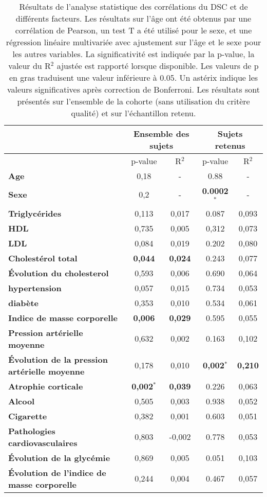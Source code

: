 \begin {table}
\caption{Résultats de l’analyse statistique des corrélations du DSC et de différents facteurs. Les résultats sur l’âge ont été
obtenus par une corrélation de Pearson, un test T a été utilisé pour le sexe, et une régression linéaire multivariée avec
ajustement sur l’âge et le sexe pour les autres variables. La significativité est indiquée par la p-value, la valeur du R$^2$ ajustée
est rapporté lorsque disponible. Les valeurs de p en gras traduisent une valeur inférieure à 0.05. Un astérix indique les valeurs
significatives après correction de Bonferroni. Les résultats sont présentés sur l’ensemble de la cohorte (sans utilisation du
critère qualité) et sur l’échantillon retenu.} 
\label{tab:crescendo2} 
\centering
\begin{tabularx}{\linewidth}{X | c c c c}
\hline
 & \multicolumn{2}{c}{{\bf Ensemble des sujets}} & \multicolumn{2}{c}{{\bf Sujets retenus}} \\
\hline
 & p-value & R$^2$ & p-value &  R$^2$\\
\hline
{\bf Age} & 0,18 & - & 0.88 & - \\
{\bf Sexe} & 0,2 & - & {\bf 0.0002$^{\ast}$} & - \\

{\bf Triglycérides} & 0,113 & 0,017 & 0.087 & 0,093\\ 
{\bf HDL} & 0,735 & 0,005 & 0,312& 0,073\\ 
{\bf LDL} & 0,084 & 0,019 & 0.202 & 0,080\\ 
{\bf Cholestérol total} & {\bf 0,044} & {\bf 0,024} & 0.243& 0,077\\ 
{\bf \'Evolution du cholesterol} & 0,593 & 0,006 & 0.690& 0,064\\ 
{\bf hypertension} & 0,057 & 0,015 & 0.734 & 0,053\\ 
{\bf diabète} & 0,353 & 0,010 & 0.534 & 0,061\\ 
{\bf Indice de masse corporelle} & {\bf 0,006} & {\bf 0,029} & 0.595 & 0,055\\ 
{\bf Pression artérielle moyenne} & 0,632 & 0,002 & 0.163 & 0,102\\ 
{\bf \'Evolution de la pression artérielle moyenne} & 0,178 & 0,010 & {\bf 0,002}$^{\ast}$& {\bf 0,210}\\ 
{\bf Atrophie corticale} & {\bf 0,002}$^{\ast}$ & {\bf 0,039} & 0.226 & 0,063\\ 
{\bf Alcool} & 0,505 & 0,003 & 0.938 & 0,052\\ 
{\bf Cigarette} & 0,382 & 0,001 & 0.603 & 0,051\\ 
{\bf Pathologies cardiovasculaires} & 0,803 & -0,002 & 0.778 & 0,053\\ 
{\bf \'Evolution de la glycémie} & 0,869 & 0,005 & 0.051 & 0,103\\ 
{\bf \'Evolution de l'indice de masse corporelle} & 0,244 & 0,004 & 0.467 & 0,057\\ 
\end{tabularx}

\end{table}

